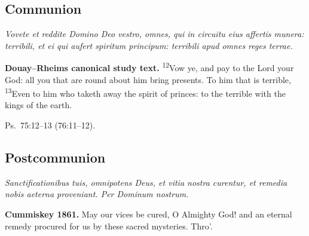 \subsection{Communion}\label{proper-communion}

\textit{Vovete et reddite Domino Deo vestro, omnes, qui in circuitu eius affertis munera: terribili, et ei qui aufert spiritum principum: terribili apud omnes reges terrae.}

\textbf{Douay--Rheims canonical study text.} \textsuperscript{12}Vow ye, and pay to the Lord your God: all you that are round about him bring presents. To him that is terrible, \textsuperscript{13}Even to him who taketh away the spirit of princes: to the terrible with the kings of the earth.

Ps.~75:12--13 (76:11--12).

\subsection{Postcommunion}\label{proper-postcommunion}

\textit{Sanctificationibus tuis, omnipotens Deus, et vitia nostra curentur, et remedia nobis aeterna proveniant. Per Dominum nostrum.}

\textbf{Cummiskey 1861.} May our vices be cured, O Almighty God! and an eternal remedy procured for us by these sacred mysteries. Thro’.
